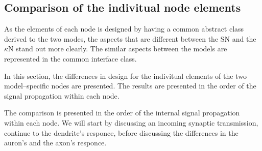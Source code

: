 
	
	\subsection{Comparison of the indivitual node elements}
				
	As the elements of each node is designed by having a common abstract class derived to the two modes, the aspects that are different between the SN and the $\kappa$N stand out more clearly.
	The similar aspects between the models are represented in the common interface class.

	In this section, the differences in design for the indivitual elements of the two model--specific nodes are presented. %
	The results are presented in the order of the signal propagation within each node.
	
	The comparison is presented in the order of the internal signal propagation within each node.
	We will start by discussing an incoming synaptic transmission, continue to the dendrite's responce, before discussing the differences in the auron's and the axon's responce.


